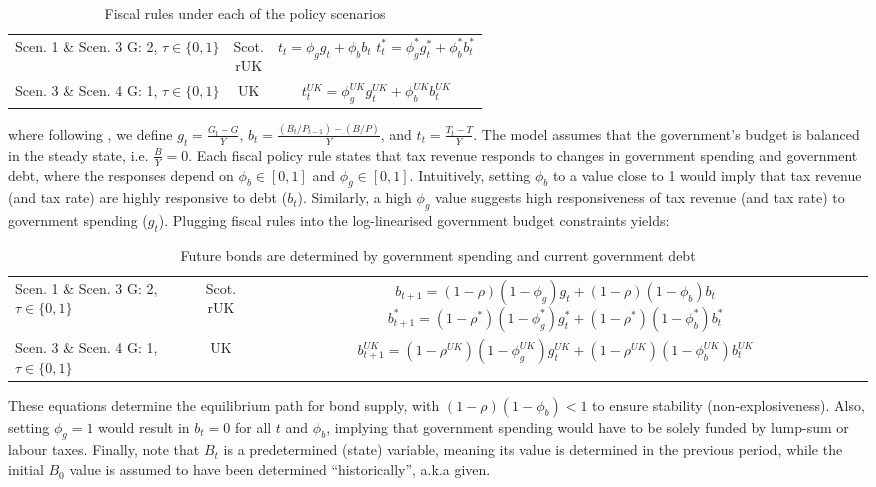 \begin{table}[H]
 \renewcommand{\arraystretch}{2}
 \centering
 \begin{tabular}{l|c|c}
 \makecell{Scen. 1 \& Scen. 3\\ G: 2, $\tau \in \{0, 1\}$} & \makecell{Scot. \\ rUK } & 
 \makecell{
 $t_t = \phi_g g_t + \phi_b b_t$\\
 $t^*_t = \phi^*_g g^*_t + \phi^*_b b^*_t$\\
 } \\ 
 \makecell{Scen. 3 \& Scen. 4\\ G: 1, $\tau \in \{0, 1\}$} & UK & 
 $t^{UK}_t = \phi^{UK}_g g^{UK}_t + \phi^{UK}_b b^{UK}_t$
 \end{tabular}
 \vspace{0.5cm}
 \caption{Fiscal rules under each of the policy scenarios}
\end{table}
where following \textcite{jordigal_2005_understanding}, we define $g_t = \frac{G_t-G}{Y}$, $b_t = \frac{(B_t/P_{t-1}) - (B/P)}{Y}$, and $t_t = \frac{T_t - T}{Y}$. The model assumes that the government's budget is balanced in the steady state, i.e. $\frac{B}{Y} = 0$. Each fiscal policy rule states that tax revenue responds to changes in government spending and government debt, where the responses depend on $\phi_b \in [0,1]$ and $\phi_g \in [0,1]$. Intuitively, setting $\phi_b$ to a value close to 1 would imply that tax revenue (and tax rate) are highly responsive to debt ($b_t$). Similarly, a high $\phi_g$ value suggests high responsiveness of tax revenue (and tax rate) to government spending ($g_t$). Plugging fiscal rules into the log-linearised government budget constraints yields:
\begin{table}[H]
 \renewcommand{\arraystretch}{2}
 \centering
 \begin{tabular}{l|c|c}
 \makecell{Scen. 1 \& Scen. 3\\ G: 2, $\tau \in \{0, 1\}$} & \makecell{Scot. \\ rUK } & 
 \makecell{
 $b_{t+1} = (1-\rho)(1-\phi_g) g_t + (1-\rho)(1-\phi_b)b_t$\\
 $b^*_{t+1} = (1-\rho^*)(1-\phi^*_g) g^*_t + (1-\rho^*)(1-\phi^*_b)b^*_t$
 } \\ 
 \makecell{Scen. 3 \& Scen. 4\\ G: 1, $\tau \in \{0, 1\}$} & UK & 
 $b^{UK}_{t+1} = (1-\rho^{UK})(1-\phi^{UK}_g) g^{UK}_t + (1-\rho^{UK})(1-\phi^{UK}_b)b^{UK}_t$
 \end{tabular}
 \vspace{0.5cm}
 \caption{Future bonds are determined by government spending and current government debt}
\end{table}
These equations determine the equilibrium path for bond supply, with \linebreak $(1-\rho)(1-\phi_b) < 1$ to ensure stability (non-explosiveness). Also, setting $\phi_g = 1$ would result in $b_t = 0$ for all $t$ and $\phi_b$, implying that government spending would have to be solely funded by lump-sum or labour taxes. Finally, note that $B_t$ is a predetermined (state) variable, meaning its value is determined in the previous period, while the initial $B_0$ value is assumed to have been determined ``historically'', a.k.a given.